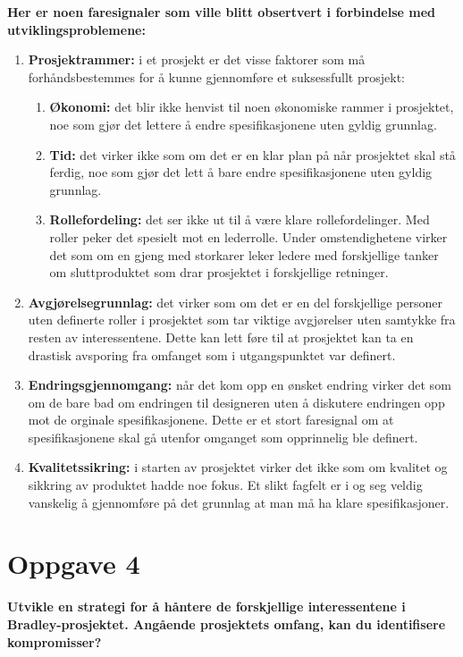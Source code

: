 	{\bf Her er noen faresignaler som ville blitt obsertvert i forbindelse med utviklingsproblemene:}
		\begin{enumerate}
			\item {\bf Prosjektrammer:} i et prosjekt er det visse faktorer som må forhåndsbestemmes
			for å kunne gjennomføre et suksessfullt prosjekt: 
			\begin{enumerate}
				\item {\bf Økonomi:} det blir ikke henvist til noen økonomiske rammer i prosjektet, 
				noe som gjør det lettere å endre spesifikasjonene uten gyldig grunnlag. 
				\item {\bf Tid:} det virker ikke som om det er en klar plan på når prosjektet skal
				stå ferdig, noe som gjør det lett å bare endre spesifikasjonene uten gyldig grunnlag.
				\item {\bf Rollefordeling:} det ser ikke ut til å være klare rollefordelinger. Med roller
				peker det spesielt mot en lederrolle. Under omstendighetene virker det som om en gjeng
				med storkarer leker ledere med forskjellige tanker om sluttproduktet som drar prosjektet
				i forskjellige retninger.
			\end{enumerate}
			\item {\bf Avgjørelsegrunnlag:} det virker som om det er en del forskjellige personer uten 
			definerte roller i prosjektet som tar viktige avgjørelser uten samtykke fra resten av 
			interessentene. Dette kan lett føre til at prosjektet kan ta en drastisk avsporing fra
			omfanget som i utgangspunktet var definert. 
			\item {\bf Endringsgjennomgang:} når det kom opp en ønsket endring virker det som om de
			bare bad om endringen til designeren uten å diskutere endringen opp mot de orginale spesifikasjonene.
			Dette er et stort faresignal om at spesifikasjonene skal gå utenfor omganget som opprinnelig ble
			definert. 
			\item {\bf Kvalitetssikring:} i starten av prosjektet virker det ikke som om kvalitet og sikkring
			av produktet hadde noe fokus. Et slikt fagfelt er i og seg veldig vanskelig å gjennomføre
			på det grunnlag at man må ha klare spesifikasjoner.
		\end{enumerate}

\clearpage
\section*{Oppgave 4}
	{\bf Utvikle en strategi for å håntere de forskjellige interessentene i Bradley-prosjektet.
	Angående prosjektets omfang, kan du identifisere kompromisser?}

